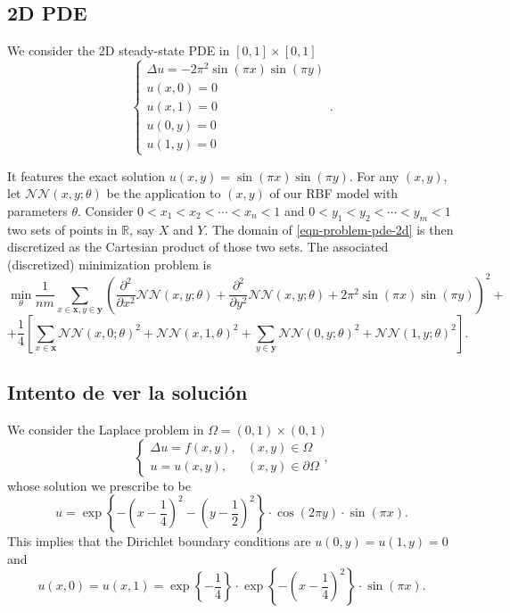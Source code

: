 \documentclass[12pt]{report} %
\newcommand{\tmmathbf}[1]{\ensuremath{\boldsymbol{#1}}}
\newcommand{\mathLaplace}{\Delta}
\begin{document}
\clearpage
\subsection{2D PDE}

We consider the 2D steady-state PDE in $[0, 1] \times [0, 1]$
\begin{equation}
  \left\{\begin{array}{l}
    \mathLaplace u = - 2 \pi^2 \sin (\pi x) \sin (\pi y) \\
    u (x, 0) = 0                                         \\
    u (x, 1) = 0                                         \\
    u (0, y) = 0                                         \\
    u (1, y) = 0
  \end{array}\right. . \label{eqn-problem-pde-2d}
\end{equation}

It features the exact solution $u (x, y) = \sin (\pi x) \sin (\pi y)$. For any
$(x, y)$, let $\mathcal{N}\mathcal{N} (x, y ; \theta)$ be the application to
$(x, y)$ of our RBF model with parameters $\theta$. Consider $0 < x_1 < x_2 <
  \cdots < x_n < 1$ and $0 < y_1 < y_2 < \cdots < y_m < 1$ two sets of points in
$\mathbb{R}$, say $X$ and $Y$. The domain of \eqref{eqn-problem-pde-2d} is
then discretized as the Cartesian product of those two sets. The associated (discretized) minimization problem is
\[ \min_{\theta} \frac{1}{n m} \sum_{x \in \tmmathbf{x}, y \in \tmmathbf{y}}
  \left( \frac{\partial^2}{\partial x^2} \mathcal{N}\mathcal{N} (x, y ;
    \theta) + \frac{\partial^2}{\partial y^2} \mathcal{N}\mathcal{N} (x, y ;
    \theta) + 2 \pi^2 \sin (\pi x) \sin (\pi y) \right)^2 + \]
\[ + \frac{1}{4} \left[ \sum_{x \in \tmmathbf{x}} \mathcal{N}\mathcal{N} (x, 0
    ; \theta)^2 +\mathcal{N}\mathcal{N} (x, 1, \theta)^2 + \sum_{y \in
      \tmmathbf{y}} \mathcal{N}\mathcal{N} (0, y ; \theta)^2
    +\mathcal{N}\mathcal{N} (1, y ; \theta)^2 \right] . \]


\subsection*{Intento de ver la solución}

We consider the Laplace problem in $\Omega = (0, 1) \times (0, 1)$
\[ \left\{\begin{array}{ll}
     \Delta u = f (x, y), & (x, y) \in \Omega\\
     u = u (x, y), & (x, y) \in \partial \Omega
   \end{array}\right., \]
whose solution we prescribe to be
\[ u = \exp \left\{ - \left( x - \frac{1}{4} \right)^2 - \left( y -
   \frac{1}{2} \right)^2 \right\} \cdot \cos (2 \pi y) \cdot \sin (\pi x) . \]
This implies that the Dirichlet boundary conditions are $u (0, y) = u (1, y) =
0$ and
\[ u (x, 0) = u (x, 1) = \exp \left\{ - \frac{1}{4} \right\} \cdot \exp
   \left\{ - \left( x - \frac{1}{4} \right)^2 \right\} \cdot \sin (\pi x) . \]
\end{document}
